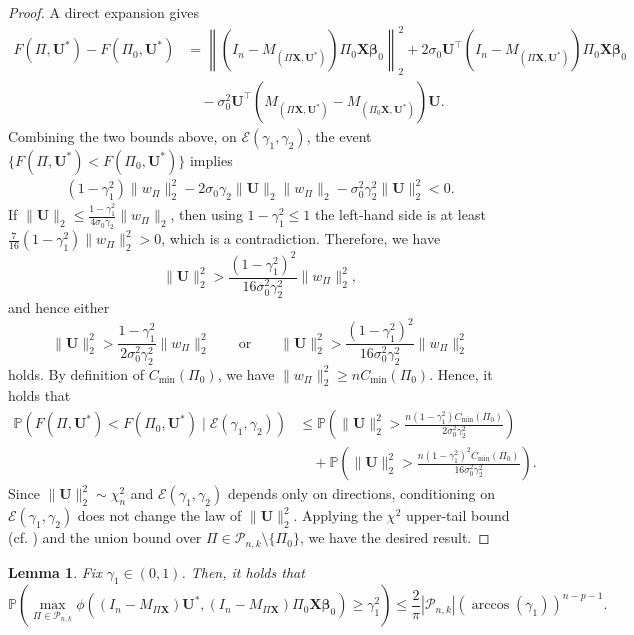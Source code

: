 \documentclass[11pt, reqno]{amsart}
\newcommand{\bP}{\mathbb{P}}
\renewcommand{\le}{\leqslant}
\renewcommand{\ge}{\geqslant}
\newcommand{\mP}{\mathcal{P}}
\newcommand{\1}{\mbox{1}\hspace{-0.25em}\mbox{l}}
\theoremstyle{definition}\newtheorem{problem}{Problem}[section]
\theoremstyle{definition}\newtheorem{definition}[problem]{Definition}
\theoremstyle{remark}\newtheorem{assumption}{Assumption}
\theoremstyle{remark}\newtheorem{remark}[problem]{Remark}
\theoremstyle{definition}\newtheorem{example}[problem]{Example}
\theoremstyle{plain}\newtheorem{theorem}[problem]{Theorem}
\theoremstyle{plain}\newtheorem{question}[problem]{Question}
\theoremstyle{plain}\newtheorem{lemma}[problem]{Lemma}
\theoremstyle{plain}\newtheorem{proposition}[problem]{Proposition}
\theoremstyle{plain}\newtheorem{corollary}[problem]{Corollary}
\theoremstyle{plain}\newtheorem{conjecture}[problem]{Conjecture}
\begin{document}
\begin{proof}
A direct expansion gives
\begin{align*}
F(\Pi,\bm U^*)-F(\Pi_0,\bm U^*)
&=
\left\|\left(I_n-M_{(\Pi\bm X,\bm U^*)}\right)\Pi_0\bm X\bm\beta_0\right\|_2^2
+2\sigma_0\bm U^\top \left(I_n-M_{(\Pi\bm X,\bm U^*)}\right)\Pi_0\bm X\bm\beta_0\\
&\quad
-\sigma_0^2\bm U^\top\left(M_{(\Pi\bm X,\bm U^*)}-M_{(\Pi_0\bm X,\bm U^*)}\right)\bm U.
\end{align*}
Combining the two bounds above, on $\mathcal E(\gamma_1,\gamma_2)$, the event $\{F(\Pi,\bm U^*)<F(\Pi_0,\bm U^*)\}$ implies
\begin{align}
(1-\gamma_1^2)\|w_\Pi\|_2^2
-2\sigma_0\gamma_2\|\bm U\|_2\|w_\Pi\|_2
-\sigma_0^2\gamma_2^2\|\bm U\|_2^2<0.
\end{align}
If $\|\bm U\|_2\le \frac{1-\gamma_1^2}{4\sigma_0\gamma_2}\|w_\Pi\|_2$, then using $1-\gamma_1^2\le 1$ the left-hand side is at least
$\frac{7}{16}(1-\gamma_1^2)\|w_\Pi\|_2^2>0$, which is a contradiction. Therefore, we have
\[
\|\bm U\|_2^2>\frac{(1-\gamma_1^2)^2}{16\sigma_0^2\gamma_2^2}\|w_\Pi\|_2^2,
\]
and hence either
\[
\|\bm U\|_2^2>\frac{1-\gamma_1^2}{2\sigma_0^2\gamma_2^2}\|w_\Pi\|_2^2\qquad\text{or}\qquad
\|\bm U\|_2^2>\frac{(1-\gamma_1^2)^2}{16\sigma_0^2\gamma_2^2}\|w_\Pi\|_2^2
\]
holds. By definition of $C_{\min}(\Pi_0)$, we have $\|w_\Pi\|_2^2\ge n C_{\min}(\Pi_0)$. Hence, it holds that
\begin{align*}
\bP\left(
F(\Pi,\bm U^*)<F(\Pi_0,\bm U^*)
\mid 
\mathcal E(\gamma_1,\gamma_2)
\right)
&\le
\bP\left(
\|\bm U\|_2^2>\frac{n(1-\gamma_1^2)C_{\min}(\Pi_0)}{2\sigma_0^2\gamma_2^2}
\right)\\
&\quad+
\bP\left(
\|\bm U\|_2^2>\frac{n(1-\gamma_1^2)^2C_{\min}(\Pi_0)}{16\sigma_0^2\gamma_2^2}
\right).
\end{align*}
Since $\|\bm U\|_2^2\sim\chi_n^2$ and $\mathcal E(\gamma_1,\gamma_2)$ depends only on directions,
conditioning on $\mathcal E(\gamma_1,\gamma_2)$ does not change the law of $\|\bm U\|_2^2$.
Applying the $\chi^2$ upper-tail bound (cf. \cite{ghosh2021exponential}) and the union bound over
$\Pi\in\mP_{n,k}\setminus\{\Pi_0\}$, we have the desired result.
\end{proof}


\begin{lemma}\label{lem:max-sim}
Fix $\gamma_1\in(0,1)$. Then, it holds that
\[
\bP\left(
\max_{\Pi\in\mP_{n,k}}
\phi\left((I_n-M_{\Pi\bm X})\bm U^*, (I_n-M_{\Pi\bm X})\Pi_0\bm X\bm\beta_0\right)
\ge \gamma_1^2
\right)
\le
\frac{2}{\pi}|\mP_{n,k}|\left(\arccos(\gamma_1)\right)^{n-p-1}.
\]
\end{lemma}
\end{document}
